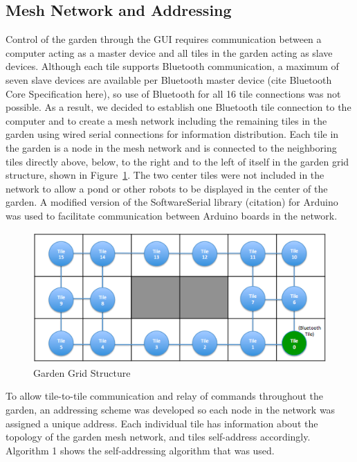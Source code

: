 \documentclass[letterpaper, 10 pt, conference]{ieeeconf}  %
\begin{document}
\subsection{\textbf{Mesh Network and Addressing}}
Control of the garden through the GUI requires communication between a computer acting as a master device and all tiles in the garden acting as slave devices. Although each tile supports Bluetooth communication, a maximum of seven slave devices are available per Bluetooth master device (cite Bluetooth Core Specification here), so use of Bluetooth for all 16 tile connections was not possible.  As a result, we decided to establish one Bluetooth tile connection to the computer and to create a mesh network including the remaining tiles in the garden using wired serial connections for information distribution.  Each tile in the garden is a node in the mesh network and is connected to the neighboring tiles directly above, below, to the right and to the left of itself in the garden grid structure, shown in Figure~\ref{fig: Grid}.  The two center tiles were not included in the network to allow a pond or other robots to be displayed in the center of the garden.  A modified version of the  SoftwareSerial library (citation) for Arduino was used to facilitate communication between Arduino boards in the network.  
\begin{figure}[thpb]
	\centering
	\includegraphics[scale=0.45]{GardenGridStructure.png}
	\caption{Garden Grid Structure}
	\label{fig: Grid}
	
\end{figure}


To allow tile-to-tile communication and relay of commands throughout the garden, an addressing scheme was developed so each node in the network was assigned a unique address.  Each individual tile has information about the topology of the garden mesh network, and tiles self-address accordingly.  Algorithm 1 shows the self-addressing algorithm that was used.
\end{document}
